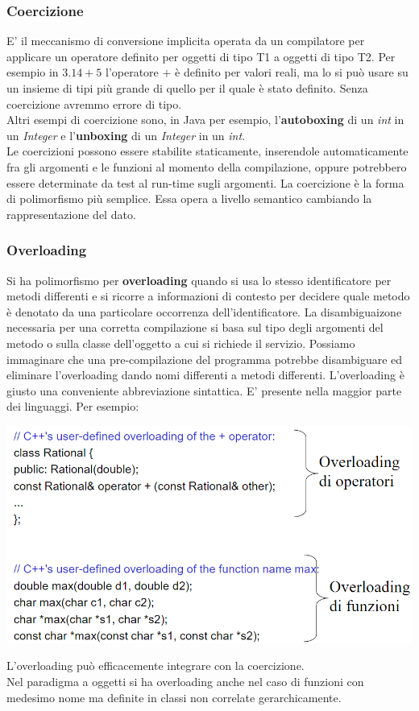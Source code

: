 \documentclass{article}
\begin{document}
	\subsubsection{Coercizione}
	E' il meccanismo di conversione implicita operata da un compilatore per applicare un operatore definito per oggetti di tipo T1 a oggetti di tipo T2. Per esempio in $3.14+5$ l'operatore $+$ è definito per valori reali, ma lo si può usare su un insieme di tipi più grande di quello per il quale è stato definito. Senza coercizione avremmo errore di tipo.\\
	Altri esempi di coercizione sono, in Java per esempio, l'\textbf{autoboxing} di un \textit{int} in un \textit{Integer} e l'\textbf{unboxing} di un \textit{Integer} in un \textit{int}. \\
	Le coercizioni possono essere stabilite staticamente, inserendole automaticamente fra gli argomenti e le funzioni al momento della compilazione, oppure potrebbero essere determinate da test al run-time sugli argomenti. La coercizione è la forma di polimorfismo più semplice. Essa opera a livello semantico cambiando la rappresentazione del dato.
	\subsubsection{Overloading}
	Si ha polimorfismo per \textbf{overloading} quando si usa lo stesso identificatore per metodi differenti e si ricorre a informazioni di contesto per decidere quale metodo è denotato da una particolare occorrenza dell'identificatore. La disambiguaizone necessaria per una corretta compilazione si basa sul tipo degli argomenti del metodo o sulla classe dell'oggetto a cui si richiede il servizio. Possiamo immaginare che una pre-compilazione del programma potrebbe disambiguare ed eliminare l'overloading dando nomi differenti a metodi differenti. L'overloading è giusto una conveniente abbreviazione sintattica. E' presente nella maggior parte dei linguaggi.
	Per esempio:
	\begin{center}
		\includegraphics[scale=0.5]{assets/overloading.png}
	\end{center}
	L'overloading può efficacemente integrare con la coercizione.\\
	Nel paradigma a oggetti si ha overloading anche nel caso di funzioni con medesimo nome ma definite in classi non correlate gerarchicamente.
\end{document}
